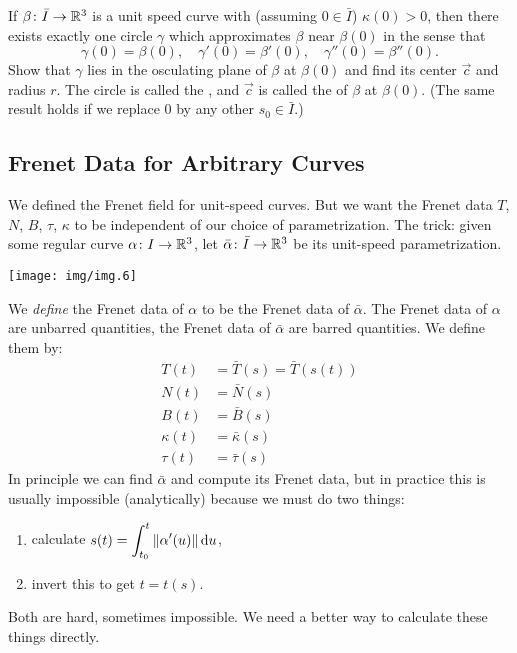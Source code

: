 \begin{enumerate}
If $\beta\colon\bar{I}\to\mathbb{R}^{3}$ is a unit speed curve with (assuming
$0\in\bar{I}$) $\kappa(0)>0$, then there exists exactly one circle
$\gamma$ which approximates $\beta$ near $\beta(0)$ in the sense that
\begin{equation}
\gamma(0) = \beta(0),\quad\gamma'(0)=\beta'(0),\quad\gamma''(0)=\beta''(0).
\end{equation}
Show that $\gamma$ lies in the osculating plane of $\beta$ at $\beta(0)$
and find its center $\vec{c}$ and radius $r$. The circle is called the
, and $\vec{c}$ is called the  of $\beta$ at $\beta(0)$.
(The same result holds if we replace $0$ by any other $s_{0}\in\bar{I}$.)
\end{enumerate}


\subsection{Frenet Data for Arbitrary Curves}

\M
We defined the Frenet field for unit-speed curves. But we want the
Frenet data $T$, $N$, $B$, $\tau$, $\kappa$ to be independent of our
choice of parametrization. The trick: given some regular curve
$\alpha\colon I\to\mathbb{R}^{3}$, let $\bar{\alpha}\colon \bar{I}\to\mathbb{R}^{3}$
be its unit-speed parametrization. 
\begin{center}
  \texttt{[image: img/img.6]}
\end{center}
We \emph{define} the Frenet data of $\alpha$ to be the Frenet data of
$\bar{\alpha}$. The Frenet data of $\alpha$ are unbarred quantities, the
Frenet data of $\bar{\alpha}$ are barred quantities. We define them by:
\begin{subequations}
  \begin{align}
    T(t) &= \bar{T}(s) = \bar{T}(s(t))\\
    N(t) &= \bar{N}(s)\\
    B(t) &= \bar{B}(s)\\
    \kappa(t) &= \bar{\kappa}(s)\\
    \tau(t) &= \bar{\tau}(s)
  \end{align}
\end{subequations}
In principle we can find $\bar{\alpha}$ and compute its Frenet data, but
in practice this is usually impossible (analytically) because we must do
two things:
\begin{enumerate}
\item calculate $\displaystyle s(t)=\int^{t}_{t_{0}}\|\alpha'(u)\|\,\mathrm{d} u$,
\item invert this to get $t = t(s)$.
\end{enumerate}
Both are hard, sometimes impossible. We need a better way to calculate
these things directly.

